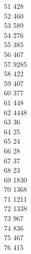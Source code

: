 { 51	428 \\
 52	460 \\
 53	589 \\
 54	276 \\
 55	385 \\
 56	467 \\
 57	9285 \\
 58	422 \\
 59	407 \\
 60	377 \\
 61	448 \\
 62	4448 \\
 63	36 \\
 64	25 \\
 65	24 \\
 66	28 \\
 67	37 \\
 68	23 \\
 69	1830 \\
 70	1368 \\
 71	1211 \\
 72	1338 \\
 73	967 \\
 74	836 \\
 75	467 \\
 76	415 \\
}
